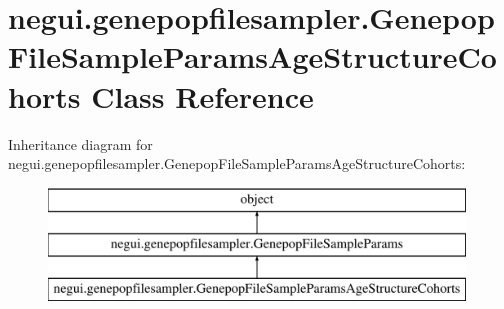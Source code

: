 \hypertarget{classnegui_1_1genepopfilesampler_1_1GenepopFileSampleParamsAgeStructureCohorts}{}\section{negui.\+genepopfilesampler.\+Genepop\+File\+Sample\+Params\+Age\+Structure\+Cohorts Class Reference}
\label{classnegui_1_1genepopfilesampler_1_1GenepopFileSampleParamsAgeStructureCohorts}
Inheritance diagram for negui.\+genepopfilesampler.\+Genepop\+File\+Sample\+Params\+Age\+Structure\+Cohorts\+:\begin{figure}[H]
\begin{center}
\leavevmode
\includegraphics[height=3.000000cm]{classnegui_1_1genepopfilesampler_1_1GenepopFileSampleParamsAgeStructureCohorts}
\end{center}
\end{figure}
